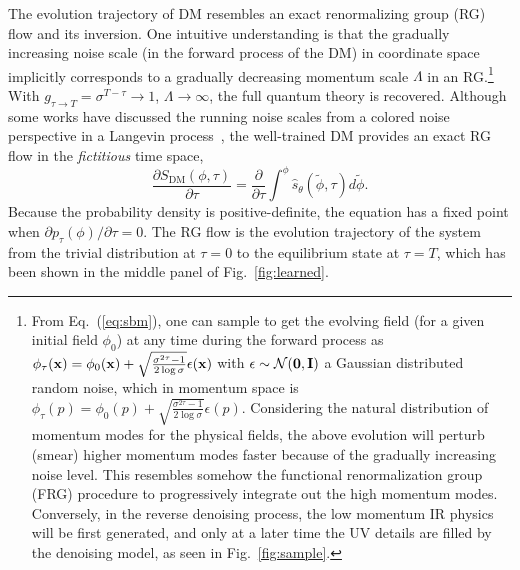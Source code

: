 The evolution trajectory of DM resembles an exact renormalizing group (RG) flow and its inversion. One intuitive understanding is that the gradually increasing noise scale (in the forward process of the DM) in coordinate space implicitly corresponds to a gradually decreasing momentum scale $\Lambda$ in an RG.\footnote{From Eq.~(\ref{eq:sbm}), one can sample to get the evolving field (for a given initial field $\phi_0$) at any time during the forward process as $\phi_{\tau}({\bf x})=\phi_{0}({\bf x}) + \sqrt{\frac{\sigma^{2\tau}-1}{2\log\sigma}}\epsilon({\bf x})$ with $\epsilon\sim\mathcal{N}({\bf 0},{\bf I})$ a Gaussian distributed random noise, which in momentum space is $\phi_{\tau}(p)=\phi_{0}(p)+\sqrt{\frac{\sigma^{2\tau}-1}{2\log\sigma}}\epsilon(p)$. Considering the natural distribution of momentum modes for the physical fields, the above evolution will perturb (smear) higher momentum modes faster because of the gradually increasing noise level. This resembles somehow the functional renormalization group (FRG) procedure to progressively integrate out the high momentum modes. Conversely, in the reverse denoising process, the low momentum IR physics will be first generated, and only at a later time the UV details are filled by the denoising model, as seen in Fig.~\ref{fig:sample}.} With $g_{\tau \rightarrow T} = \sigma^{T-\tau} \rightarrow 1$, $\Lambda \rightarrow \infty$, the full quantum theory is recovered. Although some works have discussed the running noise scales from a colored noise perspective in a Langevin process~\cite{Bern:1986xc,Pawlowski:2017rhn}, the well-trained DM provides an exact RG flow in the \textit{fictitious} time space,
\begin{equation}
    \frac{\partial S_\text{DM}(\phi,\tau)}{\partial \tau} = \frac{\partial}{\partial \tau} \int^{\phi}\hat{s}_\theta(\tilde{\phi},\tau) d\tilde{\phi}.
\end{equation}
Because the probability density is positive-definite, the equation has a fixed point when $\partial p_\tau(\phi)/\partial\tau = 0$.  The RG flow is the evolution trajectory of the system from the trivial distribution at $\tau = 0$ to the equilibrium state at $\tau = T$, which has been shown in the middle panel of Fig.~\ref{fig:learned}.

